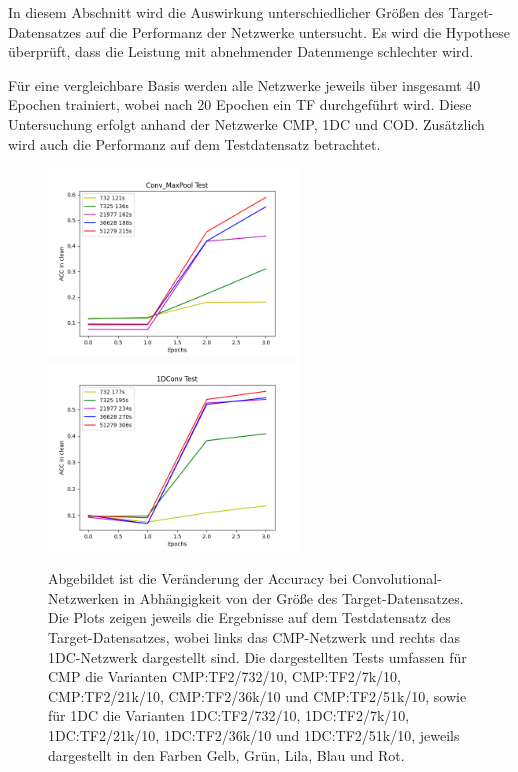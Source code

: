 In diesem Abschnitt wird die Auswirkung unterschiedlicher Größen des Target-Datensatzes auf die Performanz der Netzwerke untersucht. Es wird 
die Hypothese überprüft, dass die Leistung mit abnehmender Datenmenge schlechter wird.

Für eine vergleichbare Basis werden alle Netzwerke jeweils über insgesamt 40 Epochen trainiert, wobei nach 20 Epochen ein TF 
durchgeführt wird. Diese Untersuchung erfolgt anhand der Netzwerke CMP, 1DC und COD. Zusätzlich wird auch die Performanz auf dem Testdatensatz 
betrachtet.

\begin{figure}[htpb]
    \includegraphics[height=5cm]{../../Plots/ba_plots/targetgroesse/cmp_ts.png}
    \includegraphics[height=5cm]{../../Plots/ba_plots/targetgroesse/1dc_ts.png}
    \caption{\label{fig:targetgroessedeepdir} 
    \small{Abgebildet ist die Veränderung der Accuracy bei Convolutional-Netzwerken in Abhängigkeit von der Größe des Target-Datensatzes. Die 
    Plots zeigen jeweils die Ergebnisse auf dem Testdatensatz des Target-Datensatzes, wobei links das CMP-Netzwerk und rechts das 1DC-Netzwerk 
    dargestellt sind.
    Die dargestellten Tests umfassen für CMP die Varianten CMP:TF2/732/10, CMP:TF2/7k/10, CMP:TF2/21k/10, CMP:TF2/36k/10 und CMP:TF2/51k/10, 
    sowie für 1DC die Varianten 1DC:TF2/732/10, 1DC:TF2/7k/10, 1DC:TF2/21k/10, 1DC:TF2/36k/10 und 1DC:TF2/51k/10, jeweils dargestellt in den 
    Farben Gelb, Grün, Lila, Blau und Rot.
    }}
\end{figure}

